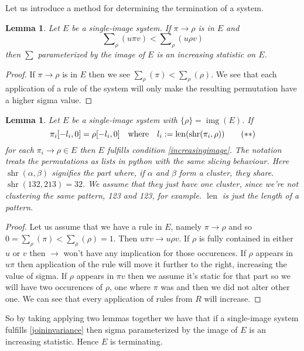 \documentclass[a4paper, 11pt]{article}
\newtheorem{lemma}[theorem]{Lemma}
\theoremstyle{definition}
\DeclareMathOperator{\img}{img}
\DeclareMathOperator{\len}{len}
\DeclareMathOperator{\shr}{shr}
\begin{document}

Let us introduce a method for determining the termination of a system.

\begin{lemma}
    Let $E$ be a single-image system. If $\pi \to \rho$ is in $E$ and 
    \[
        \sum\nolimits_\rho(u\pi v) < \sum\nolimits_\rho(u \rho v) \tag{$\ast$}
        \label{increasingimage}
    \]
    then $\sum$ parameterized by the image of $E$ is an increasing statistic on
    $E$.
\end{lemma}
\begin{proof}
    If $\pi \to \rho$ is in $E$ then we see $\sum_\rho(\pi) <
    \sum_\rho(\rho)$.  We see that each application of a rule of the system
    will only make the resulting permutation have a higher sigma value.
\end{proof}

\begin{lemma}
    Let $E$ be a single-image system with $\{\rho\} = \img(E)$. If
    \[
        \pi_i[-l_i, 0] = \rho[-l_i, 0] \quad \textnormal{where} \quad l_i :=
        \len(\shr(\pi_i, \rho)) \tag{$\ast\ast$} \label{joininvariance}
    \]
    for each $\pi_i \to \rho \in E$ then $E$ fulfills condition
    \eqref{increasingimage}. The notation treats the permutations as lists in
    python with the same slicing behaviour. Here $\shr(\alpha, \beta)$ signifies the part
    where, if $\alpha$ and $\beta$ form a cluster, they share. $\shr(132, 213) =
    32$. We assume that they just have one cluster, since we're not clustering
    the same pattern, 123 and 123, for example. $\len$ is just the length of
    a pattern.
\end{lemma}
\begin{proof}
    Let us assume that we have a rule in $E$, namely $\pi \to \rho$ and so
    $0 = \sum_\rho(\pi) < \sum_\rho(\rho) = 1$. Then $u \pi v \to u \rho v$. 
    If $\rho$ is fully contained in either $u$ or $v$ then $\to$ won't have any
    implication for those occurences. If $\rho$ appears in $u\pi$ then
    application of the rule will move it further to the right, increasing the
    value of sigma. If $\rho$ appears in $\pi v$ then we assume it's static for
    that part so we will have two occurences of $\rho$, one where $\pi$ was and
    then we did not alter other one.
    We can see that every application of rules from $R$ will increase.
\end{proof}

So by taking applying two lemmas together we have that if a single-image system
fulfills \eqref{joininvariance} then sigma parameterized by the image of $E$ is
an increasing statistic. Hence $E$ is terminating.
\end{document}
